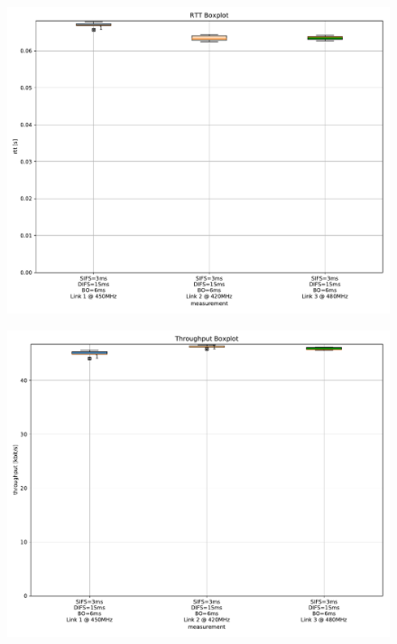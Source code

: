 \documentclass{article}
\begin{document}
\begin{figure}
	\includegraphics[width=\textwidth]{rb_single/boxplot/rtt_boxplot}
\end{figure}

\begin{figure}
	\includegraphics[width=\textwidth]{rb_single/boxplot/throughput_boxplot}
\end{figure}


\end{document}
